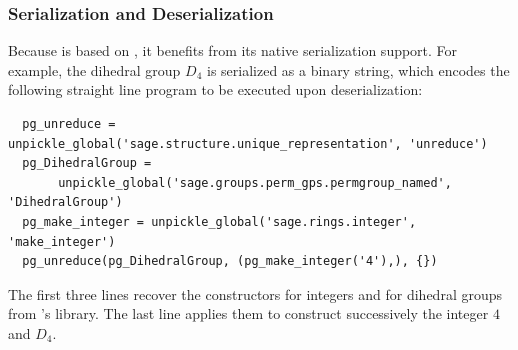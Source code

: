 
\subsubsection{Serialization and Deserialization}\label{lst:sagedihedral}

Because \Sage is based on \Python, it benefits from its native serialization support.
For example, the dihedral group $D_4$ is serialized as a binary string, which encodes the following straight line program to be executed upon deserialization:
\begin{lstlisting}
  pg_unreduce = unpickle_global('sage.structure.unique_representation', 'unreduce')
  pg_DihedralGroup = 
       unpickle_global('sage.groups.perm_gps.permgroup_named', 'DihedralGroup')
  pg_make_integer = unpickle_global('sage.rings.integer', 'make_integer')
  pg_unreduce(pg_DihedralGroup, (pg_make_integer('4'),), {})
\end{lstlisting}
The first three lines recover the constructors for integers and for dihedral groups from \Sage's library.
The last line applies them to construct successively the integer $4$ and $D_4$.

